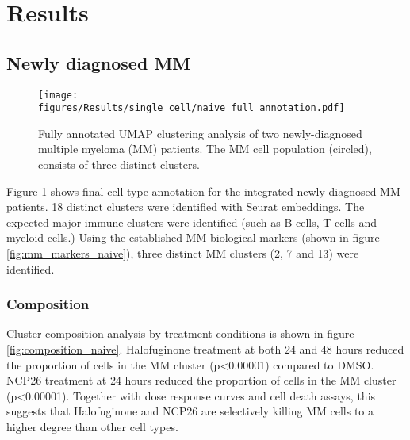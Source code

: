 



\clearpage
\section{Results}

\subsection{Newly diagnosed MM}


\begin{figure}[hpt]
\centering
\texttt{[image: figures/Results/single\_cell/naive\_full\_annotation.pdf]}
\caption[Newly-diagnosed MM scRNA-seq full annotation]{Fully annotated UMAP clustering analysis of two newly-diagnosed multiple myeloma (MM) patients.
The MM cell population (circled), consists of three distinct clusters.}
\label{fig:full_anno_naive}
\end{figure}

Figure \ref{fig:full_anno_naive} shows final cell-type annotation for the integrated newly-diagnosed MM patients.
18 distinct clusters were identified with Seurat embeddings.
The expected major immune clusters were identified (such as B cells, T cells and myeloid cells.)
Using the established MM biological markers (shown in figure \ref{fig:mm_markers_naive}), three distinct MM clusters (2, 7 and 13) were identified.

\subsubsection{Composition}
Cluster composition analysis by treatment conditions is shown in figure \ref{fig:composition_naive}.
Halofuginone treatment at both 24 and 48 hours reduced the proportion of cells in the MM cluster (p<0.00001) compared to DMSO.
NCP26 treatment at 24 hours reduced the proportion of cells in the MM cluster (p<0.00001).
Together with dose response curves and cell death assays, this suggests that Halofuginone and NCP26 are selectively killing MM cells to a higher degree than other cell types.

